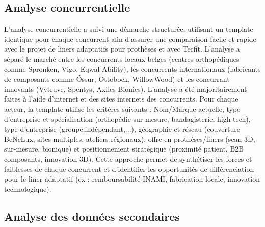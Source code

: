 \subsection{Analyse concurrentielle}

L'analyse concurrentielle a suivi une démarche structurée,
utilisant un template identique pour chaque concurrent afin d'assurer une comparaison facile et rapide avec le projet de liners adaptatifs pour prothèses et avec Tecfit.
L'analyse a séparé le marché entre les concurrents locaux belges (centres orthopédiques comme Spronken, Vigo, Eqwal Ability), les concurrents internationaux (fabricants de composants comme Össur, Ottobock, WillowWood) et les concurrant innovants (Vytruve, Spentys, Axiles Bionics). 
L'analyse a été majoritairement faites à l'aide d'internet et des sites internets des concurrents. Pour chaque acteur, la template utilise les critères suivants : Nom/Marque actuelle, type d'entreprise et spécialisation (orthopédie sur mesure, bandagisterie, high-tech), type d'entreprise (groupe,indépendant,...),
géographie et réseau (couverture BeNeLux, sites multiples, ateliers régionaux), offre en prothèses/liners (scan 3D, sur-mesure, bionique) et positionnement stratégique (proximité patient, B2B composants, innovation 3D). 
Cette approche permet de synthétiser les forces et faiblesses de chaque concurrent et d'identifier les opportunités de différenciation pour le liner adaptatif (ex : remboursabilité INAMI, fabrication locale, innovation technologique).

\subsection{Analyse des données secondaires}

